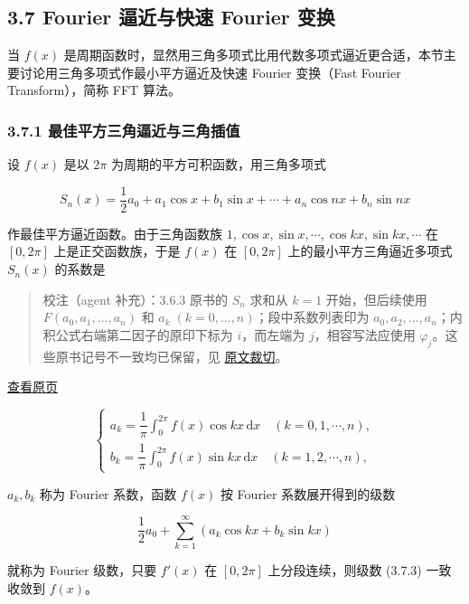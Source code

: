 \documentclass[
  10pt,
  fontset=fandol]{ctexart}
\begin{document}
\subsection{3.7 Fourier 逼近与快速 Fourier 变换}\label{fourier-ux903cux8fd1ux4e0eux5febux901f-fourier-ux53d8ux6362}

当 \(f(x)\) 是周期函数时，显然用三角多项式比用代数多项式逼近更合适，本节主要讨论用三角多项式作最小平方逼近及快速 Fourier 变换（Fast Fourier Transform），简称 FFT 算法。

\subsubsection{3.7.1 最佳平方三角逼近与三角插值}\label{ux6700ux4f73ux5e73ux65b9ux4e09ux89d2ux903cux8fd1ux4e0eux4e09ux89d2ux63d2ux503c}

设 \(f(x)\) 是以 \(2\pi\) 为周期的平方可积函数，用三角多项式

\[
S_n(x)=\frac12a_0+a_1\cos x+b_1\sin x+\cdots+a_n\cos nx+b_n\sin nx\tag{3.7.1}
\]

作最佳平方逼近函数。由于三角函数族 \(1,\allowbreak \cos x,\allowbreak \sin x,\allowbreak \cdots,\allowbreak \cos kx,\allowbreak \sin kx,\allowbreak \cdots\) 在 \([0,2\pi]\) 上是正交函数族，于是 \(f(x)\) 在 \([0,2\pi]\) 上的最小平方三角逼近多项式 \(S_n(x)\) 的系数是

\begin{quote}
校注（agent 补充）：3.6.3 原书的 \(S_n\) 求和从 \(k=1\) 开始，但后续使用 \(F(a_0,a_1,\ldots,a_n)\) 和 \(a_k\;(k=0,\ldots,n)\)；段中系数列表印为 \(a_0,a_2,\ldots,a_n\)；内积公式右端第二因子的原印下标为 \(i\)，而左端为 \(j\)，相容写法应使用 \(\varphi_j\)。这些原书记号不一致均已保留，见 \href{../assets/ch03b/p084-multivariate-formulas.png}{原文裁切}。
\end{quote}

\href{../../source-images/pdf-085.jpeg}{查看原页}

\[
\begin{cases}
a_k=\dfrac1\pi\displaystyle\int_0^{2\pi}f(x)\cos kx\,\mathrm dx\quad(k=0,1,\cdots,n),\\[4pt]
b_k=\dfrac1\pi\displaystyle\int_0^{2\pi}f(x)\sin kx\,\mathrm dx\quad(k=1,2,\cdots,n),
\end{cases}\tag{3.7.2}
\]

\(a_k,b_k\) 称为 Fourier 系数，函数 \(f(x)\) 按 Fourier 系数展开得到的级数

\[
\frac12a_0+\sum_{k=1}^{\infty}(a_k\cos kx+b_k\sin kx)\tag{3.7.3}
\]

就称为 Fourier 级数，只要 \(f'(x)\) 在 \([0,2\pi]\) 上分段连续，则级数 (3.7.3) 一致收敛到 \(f(x)\)。
\end{document}
